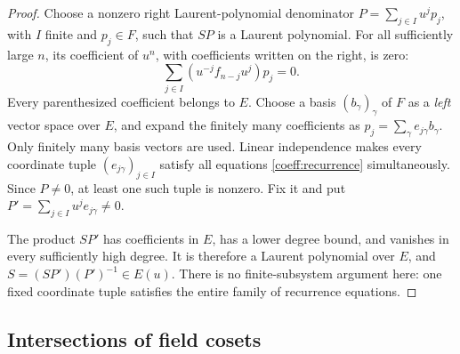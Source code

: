 \begin{proof}
Choose a nonzero right Laurent-polynomial denominator
\(P=\sum_{j\in I}u^jp_j\), with \(I\) finite and \(p_j\in F\),
such that \(SP\) is a Laurent polynomial. For all sufficiently large
\(n\), its coefficient of \(u^n\), with coefficients written on the
right, is zero:
\begin{equation}\label{coeff:recurrence}
 \sum_{j\in I}(u^{-j}f_{n-j}u^j)p_j=0.
\end{equation}
Every parenthesized coefficient belongs to \(E\). Choose a basis
\((b_\gamma)_\gamma\) of \(F\) as a \emph{left} vector space over
\(E\), and expand the finitely many coefficients as
\(p_j=\sum_\gamma e_{j\gamma}b_\gamma\). Only finitely many basis
vectors are used. Linear independence makes every coordinate tuple
\((e_{j\gamma})_{j\in I}\) satisfy all equations
\eqref{coeff:recurrence} simultaneously. Since \(P\ne0\), at least
one such tuple is nonzero. Fix it and put
\(P'=\sum_{j\in I}u^je_{j\gamma}\ne0\).

The product \(SP'\) has coefficients in \(E\), has a lower degree
bound, and vanishes in every sufficiently high degree. It is therefore
a Laurent polynomial over \(E\), and \(S=(SP')(P')^{-1}\in E(u)\).
There is no finite-subsystem argument here: one fixed coordinate tuple
satisfies the entire family of recurrence equations.
\end{proof}

\subsection{Intersections of field cosets}

